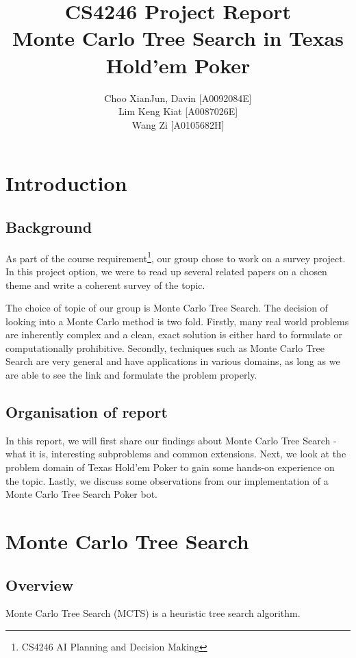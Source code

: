 \documentclass[11pt, a4paper, oneside]{article}
\begin{document}
\title{CS4246 Project Report\\ Monte Carlo Tree Search in Texas Hold'em Poker}
\author{Choo XianJun, Davin [A0092084E] \\ Lim Keng Kiat [A0087026E] \\ Wang Zi [A0105682H]}
\date{} %
\maketitle

\tableofcontents

\section{Introduction}
\subsection{Background}
As part of the course requirement\footnote{CS4246 AI Planning and Decision Making}, our group chose to work on a survey project. In this project option, we were to read up several related papers on a chosen theme and write a coherent survey of the topic.

The choice of topic of our group is Monte Carlo Tree Search. The decision of looking into a Monte Carlo method is two fold. Firstly, many real world problems are inherently complex and a clean, exact solution is either hard to formulate or computationally prohibitive. Secondly, techniques such as Monte Carlo Tree Search are very general and have applications in various domains, as long as we are able to see the link and formulate the problem properly.

\subsection{Organisation of report}
In this report, we will first share our findings about Monte Carlo Tree Search - what it is, interesting subproblems and common extensions. Next, we look at the problem domain of Texas Hold'em Poker to gain some hands-on experience on the topic. Lastly, we discuss some observations from our implementation of a Monte Carlo Tree Search Poker bot.

\section{Monte Carlo Tree Search}
\subsection{Overview}
Monte Carlo Tree Search (MCTS) is a heuristic tree search algorithm.
\end{document}
